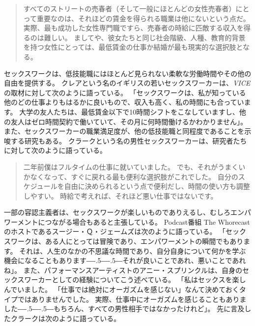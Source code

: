 \documentclass[paper=a4,book,openany]{jlreq}
\newcommand{\ig}[1]{}           %
\def\DDASH{―\kern-.5\zw―\kern-.5\zw―}
\begin{document}
\begin{quote}
すべてのストリートの売春者（そして一般にほとんどの女性売春者）にとって重要なのは、それほどの賃金を得られる職業は他にないという点だ。
実際、最も成功した女性専門職ですら、売春者の時給に匹敵する収入を得るのは難しい。
ましてや、彼女たちと同じ社会階級、人種、教育的背景を持つ女性にとっては、最低賃金の仕事か結婚が最も現実的な選択肢となる。
\citep[p.104]{bernstein99:_whats_wrong_prost}\ig{Elizabeth Bernstein}
\end{quote}

セックスワークは、低技能職にはほとんど見られない柔軟な労働時間やその他の自由を提供する。
クレアという名のイギリスの若いセックスワーカーは、\emph{VICE}の取材に対して次のように語っている。
「セックスワークは、私が知っている他のどの仕事よりもはるかに良いもので、収入も高く、私の時間にも合っています。
大学の友人たちは、最低賃金以下で10時間シフトをこなしていますし、他の友人はゼロ時間契約で働いていて、その月に何時間働けるかわかりません」\citep{mcintyre15:_what_its_like_pay_your}。
また、セックスワーカーの職業満足度が、他の低技能職と同程度であることを示唆する研究もある\citep{bilardi11:_job_satis_femal_sex_worker}。
クラークという名の男性セックスワーカーは、研究者たちに対して次のように語っている。

\begin{quote}
二年前僕はフルタイムの仕事に就いていました。
でも、それがうまくいかなくなって、すぐに戻れる最も便利な選択肢がこれでした。
自分のスケジュールを自由に決められるという点で便利だし、時間の使い方も調整しやすい。
時給で考えれば、それほど悪い仕事ではないです。
\citep[p.11]{curtis19:_we_are_naked_waitr_who_deliv_sex}
\end{quote}

一部の容認主義者は、セックスワークが楽しいものでありえるし、むしろエンパワーメントにつながる場合もあると主張している。
Podcast番組 The Whorecast のホストであるスージー・Ｑ・ジェームズは次のように語っている。
「セックスワークは、ある人にとっては冒険であり、エンパワーメントの瞬間でもあります。
それは、人生のなかの不思議な時間であり、自分自身について何かを学ぶ機会になることもあります{\DDASH}それが良いことであれ、悪いことであれね」\citep{richardson14:_is_sex_work_empow_enslav}。
また、パフォーマンスアーティストのアニー・スプリンクルは、自身のセックスワーカーとしての経験についてこう述べている。
「私はセックスを楽しんでいました。
「仕事では絶対にオーガズムを感じない」なんて決めておくタイプではありませんでした。
実際、仕事中にオーガズムを感じることもありました{\DDASH}もちろん、すべての男性相手ではなかったけれど」\citep[pp.42-43]{bell95:_whore_carniv}。
先に言及したクラークは次のように語っている。
\end{document}
